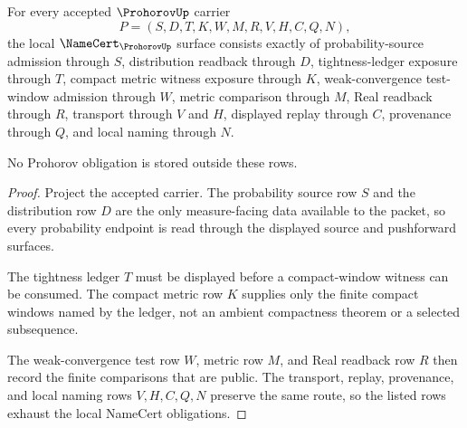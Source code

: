 \begin{theorem}
\label{thm:prohorov-namecert-obligations}
For every accepted $\ProhorovUp$ carrier
$$
P=(S,D,T,K,W,M,R,V,H,C,Q,N),
$$
the local $\NameCert_{\ProhorovUp}$ surface consists exactly of probability-source admission through $S$, distribution readback through $D$, tightness-ledger exposure through $T$, compact metric witness exposure through $K$, weak-convergence test-window admission through $W$, metric comparison through $M$, Real readback through $R$, transport through $V$ and $H$, displayed replay through $C$, provenance through $Q$, and local naming through $N$.

No Prohorov obligation is stored outside these rows.
\end{theorem}
\begin{proof}
Project the accepted carrier. The probability source row $S$ and the distribution row $D$ are the only measure-facing data available to the packet, so every probability endpoint is read through the displayed source and pushforward surfaces.

The tightness ledger $T$ must be displayed before a compact-window witness can be consumed. The compact metric row $K$ supplies only the finite compact windows named by the ledger, not an ambient compactness theorem or a selected subsequence.

The weak-convergence test row $W$, metric row $M$, and Real readback row $R$ then record the finite comparisons that are public. The transport, replay, provenance, and local naming rows $V,H,C,Q,N$ preserve the same route, so the listed rows exhaust the local NameCert obligations.
\end{proof}

